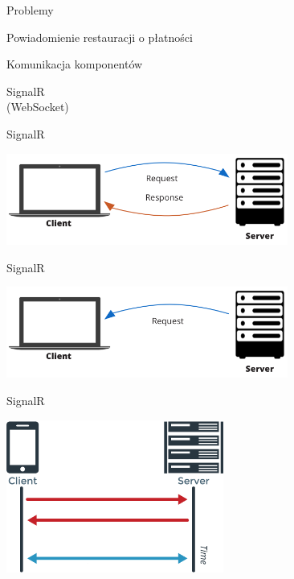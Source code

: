 \documentclass{beamer}
\begin{document}
\begin{frame}{Problemy}
	\begin{center}
		\Huge{Powiadomienie restauracji o płatności}
	\end{center}
\end{frame}

\begin{frame}{Komunikacja komponentów}
	\begin{center}
		\Huge{SignalR}\\
		\huge{(WebSocket)}
	\end{center}
\end{frame}

\begin{frame}{SignalR}
	\begin{center}
		\includegraphics[height=3cm]{prosta_komunikacja2.png}
	\end{center}
\end{frame}

\begin{frame}{SignalR}
	\begin{center}
		\includegraphics[height=3cm]{signalr1.png}
	\end{center}
\end{frame}

\begin{frame}{SignalR}
	\begin{center}
		\includegraphics[height=5cm]{websocket1.png}
	\end{center}
\end{frame}
\end{document}
